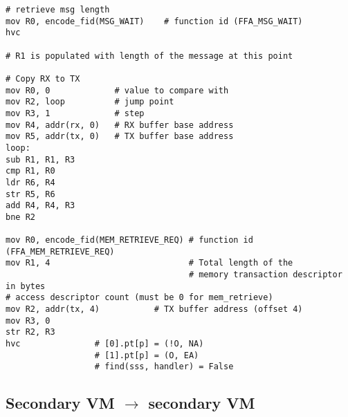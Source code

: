 \documentclass{article}
\begin{document}
\begin{lstlisting}[caption={VM 1}]
# retrieve msg length
mov R0, encode_fid(MSG_WAIT)    # function id (FFA_MSG_WAIT)
hvc

# R1 is populated with length of the message at this point

# Copy RX to TX
mov R0, 0             # value to compare with
mov R2, loop          # jump point
mov R3, 1             # step
mov R4, addr(rx, 0)   # RX buffer base address
mov R5, addr(tx, 0)   # TX buffer base address
loop:
sub R1, R1, R3
cmp R1, R0
ldr R6, R4
str R5, R6
add R4, R4, R3
bne R2

mov R0, encode_fid(MEM_RETRIEVE_REQ) # function id (FFA_MEM_RETRIEVE_REQ)
mov R1, 4                            # Total length of the  
                                     # memory transaction descriptor in bytes
# access descriptor count (must be 0 for mem_retrieve)
mov R2, addr(tx, 4)           # TX buffer address (offset 4)
mov R3, 0
str R2, R3                                    
hvc               # [0].pt[p] = (!O, NA)
                  # [1].pt[p] = (O, EA)
                  # find(sss, handler) = False
\end{lstlisting}

\subsection{Secondary VM $\rightarrow$ secondary VM}
\end{document}

